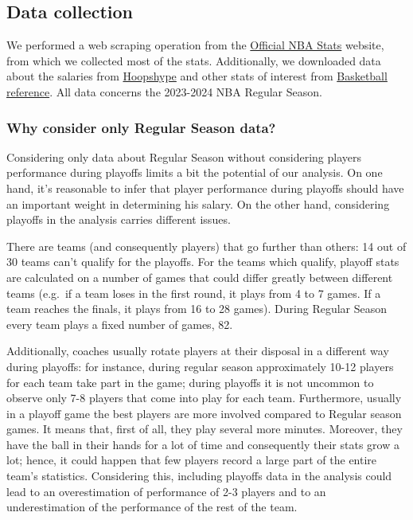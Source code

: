 \documentclass[
]{article}
\begin{document}
\hypertarget{data-collection}{%
\subsection{Data collection}\label{data-collection}}

We performed a web scraping operation from the
\href{https://www.nba.com/stats}{Official NBA Stats} website, from which
we collected most of the stats. Additionally, we downloaded data about
the salaries from \href{https://hoopshype.com/}{Hoopshype} and other
stats of interest from
\href{https://www.basketball-reference.com}{Basketball reference}. All
data concerns the 2023-2024 NBA Regular Season.

\hypertarget{why-consider-only-regular-season-data}{%
\subsubsection{Why consider only Regular Season
data?}\label{why-consider-only-regular-season-data}}

Considering only data about Regular Season without considering players
performance during playoffs limits a bit the potential of our analysis.
On one hand, it's reasonable to infer that player performance during
playoffs should have an important weight in determining his salary. On
the other hand, considering playoffs in the analysis carries different
issues.

There are teams (and consequently players) that go further than others:
14 out of 30 teams can't qualify for the playoffs. For the teams which
qualify, playoff stats are calculated on a number of games that could
differ greatly between different teams (e.g.~if a team loses in the
first round, it plays from 4 to 7 games. If a team reaches the finals,
it plays from 16 to 28 games). During Regular Season every team plays a
fixed number of games, 82.

Additionally, coaches usually rotate players at their disposal in a
different way during playoffs: for instance, during regular season
approximately 10-12 players for each team take part in the game; during
playoffs it is not uncommon to observe only 7-8 players that come into
play for each team. Furthermore, usually in a playoff game the best
players are more involved compared to Regular season games. It means
that, first of all, they play several more minutes. Moreover, they have
the ball in their hands for a lot of time and consequently their stats
grow a lot; hence, it could happen that few players record a large part
of the entire team's statistics. Considering this, including playoffs
data in the analysis could lead to an overestimation of performance of
2-3 players and to an underestimation of the performance of the rest of
the team.
\end{document}
